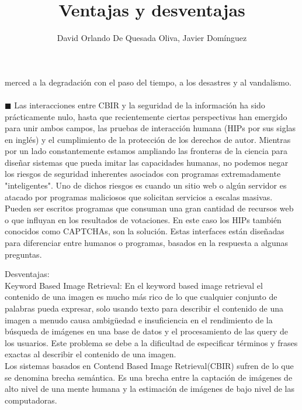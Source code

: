 \documentclass{llncs}
\begin{document}
merced a la degradación con el paso del tiempo, a los desastres y al vandalismo.
\\\\
\noindent $\blacksquare$ Las interacciones entre CBIR y la seguridad de la información ha sido prácticamente nulo, hasta que recientemente ciertas perspectivas 
han emergido  para unir ambos campos, las pruebas de interacción humana (HIPs por sus siglas en inglés) y el cumplimiento de 
la protección de los derechos de autor. Mientras por un lado constantemente estamos ampliando las fronteras de la ciencia para 
diseñar sistemas que pueda imitar las capacidades humanas, no podemos negar los riesgos de seguridad inherentes asociados con 
programas extremadamente "inteligentes". Uno de dichos riesgos es cuando un sitio web o algún servidor es atacado por programas 
maliciosos que solicitan servicios a escalas masivas. Pueden ser escritos programas que consuman una gran cantidad de recursos web o 
que influyan en los resultados de votaciones. En este caso los HIPs también conocidos como CAPTCHAs, son la solución. Estas interfaces 
están diseñadas para diferenciar entre humanos o programas, basados en la respuesta a algunas preguntas.


\newpage

\title{Ventajas y desventajas}
\author{David Orlando De Quesada Oliva, Javier Dom\'inguez}
\maketitle

Desventajas:\\
Keyword Based Image Retrieval:
En el keyword based image retrieval el contenido de una imagen es mucho m\'as rico de lo que cualquier conjunto de palabras pueda 
expresar, solo usando texto para describir el contenido de una imagen a menudo causa ambig\"{u}edad e insuficiencia en el rendimiento
de la b\'usqueda de im\'agenes en una base de datos y el procesamiento de las query de los usuarios. Este problema se debe a la 
dificultad de especificar t\'erminos y frases exactas al describir el contenido de una imagen.
\\
Los sistemas basados en Contend Based Image Retrieval(CBIR) sufren de lo que se denomina brecha sem\'antica. Es una brecha 
entre la captaci\'on de im\'agenes de alto nivel de una mente humana y la estimaci\'on de im\'agenes de bajo nivel de 
las computadoras. 
\end{document}

